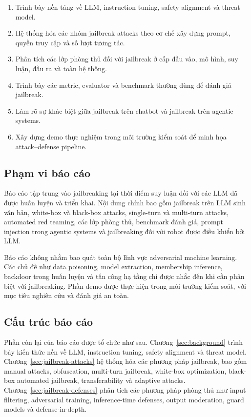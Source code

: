\begin{enumerate}[label=\textbf{M\arabic*.}, leftmargin=2.2cm]
    \item Trình bày nền tảng về LLM, instruction tuning, safety alignment
    và threat model.
    \item Hệ thống hóa các nhóm jailbreak attacks theo cơ chế xây dựng
    prompt, quyền truy cập và số lượt tương tác.
    \item Phân tích các lớp phòng thủ đối với jailbreak ở cấp đầu vào,
    mô hình, suy luận, đầu ra và toàn hệ thống.
    \item Trình bày các metric, evaluator và benchmark thường dùng để
    đánh giá jailbreak.
    \item Làm rõ sự khác biệt giữa jailbreak trên chatbot và jailbreak
    trên agentic systems.
    \item Xây dựng demo thực nghiệm trong môi trường kiểm soát để minh họa
    attack--defense pipeline.
\end{enumerate}

\subsection{Phạm vi báo cáo}
\label{subsec:report-scope}

Báo cáo tập trung vào jailbreaking tại thời điểm suy luận đối với các LLM
đã được huấn luyện và triển khai. Nội dung chính bao gồm jailbreak trên LLM
sinh văn bản, white-box và black-box attacks, single-turn và multi-turn
attacks, automated red teaming, các lớp phòng thủ, benchmark đánh giá,
prompt injection trong agentic systems và jailbreaking đối với robot được
điều khiển bởi LLM.

Báo cáo không nhằm bao quát toàn bộ lĩnh vực adversarial machine learning.
Các chủ đề như data poisoning, model extraction, membership inference,
backdoor trong huấn luyện và tấn công hạ tầng chỉ được nhắc đến khi cần
phân biệt với jailbreaking. Phần demo được thực hiện trong môi trường kiểm
soát, với mục tiêu nghiên cứu và đánh giá an toàn.

\subsection{Cấu trúc báo cáo}
\label{subsec:report-structure}

Phần còn lại của báo cáo được tổ chức như sau. Chương~\ref{sec:background}
trình bày kiến thức nền về LLM, instruction tuning, safety alignment và
threat model. Chương~\ref{sec:jailbreak-attacks} hệ thống hóa các phương
pháp jailbreak, bao gồm manual attacks, obfuscation, multi-turn jailbreak,
white-box optimization, black-box automated jailbreak, transferability và
adaptive attacks. Chương~\ref{sec:jailbreak-defenses} phân tích các phương
pháp phòng thủ như input filtering, adversarial training, inference-time
defenses, output moderation, guard models và defense-in-depth.

